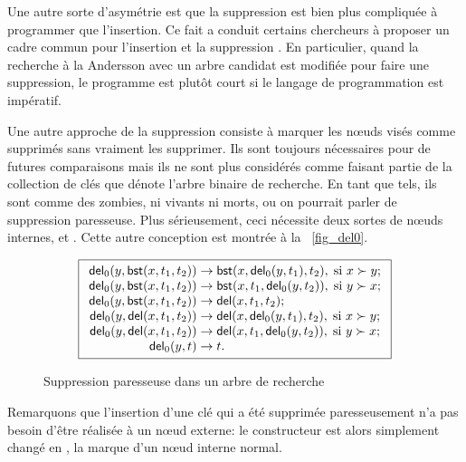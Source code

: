 Une autre sorte d'asymétrie est que la suppression est bien plus
compliquée à programmer que l'insertion. Ce fait a conduit certains
chercheurs à proposer un cadre commun pour l'insertion et la
suppression \citep{Andersson_1991,Hinze_2002}. En particulier, quand
la recherche à la Andersson avec un arbre candidat est modifiée pour
faire une suppression, le programme est plutôt court si le langage de
programmation est impératif.

Une autre approche de la suppression consiste à marquer les n{\oe}uds
visés comme supprimés sans vraiment les supprimer. Ils sont toujours
nécessaires pour de futures comparaisons mais ils ne sont plus
considérés comme faisant partie de la collection de clés que dénote
l'arbre binaire de recherche. En tant que tels, ils sont comme des
zombies, ni vivants ni morts, ou on pourrait parler de suppression
paresseuse. Plus sérieusement, ceci nécessite deux sortes de n{\oe}uds
internes,  et . Cette
autre conception est montrée à la \fig~\vref{fig_del0}.
\begin{figure}
\begin{equation*}
\boxed{
\begin{array}{r@{\;}l@{\;}l}
  \fun{del}_0(y,\fun{bst}(x,t_1,t_2)) & \rightarrow &
  \fun{bst}(x,\fun{del}_0(y,t_1),t_2),\; \text{si \(x \succ y\)};\\
\fun{del}_0(y,\fun{bst}(x,t_1,t_2)) & \rightarrow &
  \fun{bst}(x,t_1,\fun{del}_0(y,t_2)),\; \text{si \(y \succ x\)};\\
\fun{del}_0(y,\fun{bst}(x,t_1,t_2)) & \rightarrow & 
  \fun{del}(x,t_1,t_2);\\
\fun{del}_0(y,\fun{del}(x,t_1,t_2)) & \rightarrow &
  \fun{del}(x,\fun{del}_0(y,t_1),t_2),\; \text{si \(x \succ y\)};\\
\fun{del}_0(y,\fun{del}(x,t_1,t_2)) & \rightarrow &
  \fun{del}(x,t_1,\fun{del}_0(y,t_2)),\; \text{si \(y \succ x\)};\\
\fun{del}_0(y,t) & \rightarrow & t.\\
\end{array}}
\end{equation*}
\caption{Suppression paresseuse dans un arbre de recherche\label{fig_del0}}
\end{figure}
Remarquons que l'insertion d'une clé qui a été supprimée
paresseusement n'a pas besoin d'être réalisée à un n{\oe}ud externe:
le constructeur  est alors simplement changé en
, la marque d'un n{\oe}ud interne normal.

